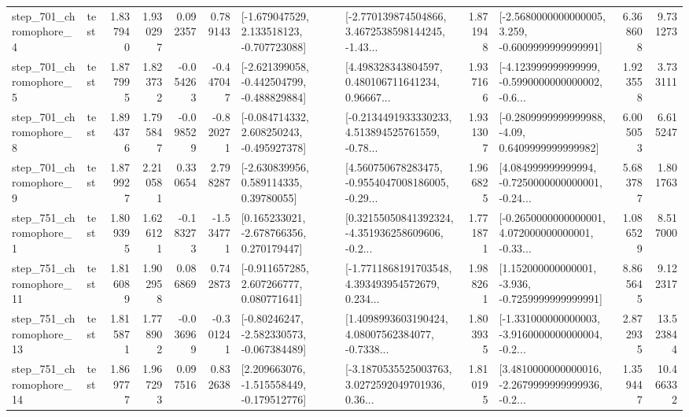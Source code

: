 \begin{tabular}{llrrrrllrlrr}
   step\_701\_chromophore\_4 &      test &      1.837940 &    1.930297 &      0.092357 &  0.789143 &   [-1.679047529, 2.133518123, -0.707723088] &  [-2.770139874504866, 3.4672538598144245, -1.43... &       1.871948 &  [-2.5680000000000005, 3.259, -0.6009999999999991] &            6.368608 &          9.731273 \\
   step\_701\_chromophore\_5 &      test &      1.877995 &    1.823732 &     -0.054263 & -0.447047 &  [-2.621399058, -0.442504799, -0.488829884] &  [4.498328343804597, 0.480106711641234, 0.96667... &       1.937166 &  [-4.123999999999999, -0.5990000000000002, -0.6... &            1.923558 &          3.733111 \\
   step\_701\_chromophore\_8 &      test &      1.894376 &    1.795847 &     -0.098529 & -0.820271 &   [-0.084714332, 2.608250243, -0.495927378] &  [-0.2134491933330233, 4.513894525761559, -0.78... &       1.931307 &   [-0.2809999999999988, -4.09, 0.6409999999999982] &            6.005053 &          6.615247 \\
   step\_701\_chromophore\_9 &      test &      1.879927 &    2.210581 &      0.330654 &  2.798287 &     [-2.630839956, 0.589114335, 0.39780055] &  [4.560750678283475, -0.9554047008186005, -0.29... &       1.966825 &  [4.084999999999994, -0.7250000000000001, -0.24... &            5.683787 &          1.801763 \\
   step\_751\_chromophore\_1 &      test &      1.809395 &    1.626121 &     -0.183273 & -1.534771 &    [0.165233021, -2.678766356, 0.270179447] &  [0.32155050841392324, -4.351936258609606, -0.2... &       1.771871 &  [-0.2650000000000001, 4.072000000000001, -0.33... &            1.086529 &          8.517000 \\
  step\_751\_chromophore\_11 &      test &      1.816089 &    1.902958 &      0.086869 &  0.742873 &    [-0.911657285, 2.607266777, 0.080771641] &  [-1.7711868191703548, 4.393493954572679, 0.234... &       1.988261 &   [1.152000000000001, -3.936, -0.7259999999999991] &            8.865645 &          9.122317 \\
  step\_751\_chromophore\_13 &      test &      1.815871 &    1.778902 &     -0.036969 & -0.301241 &   [-0.80246247, -2.582330573, -0.067384489] &  [1.4098993603190424, 4.08007562384077, -0.7338... &       1.803935 &  [-1.331000000000003, -3.9160000000000004, -0.2... &            2.872935 &         13.523844 \\
  step\_751\_chromophore\_14 &      test &      1.869777 &    1.967293 &      0.097516 &  0.832638 &   [2.209663076, -1.515558449, -0.179512776] &  [-3.1870535525003763, 3.0272592049701936, 0.36... &       1.810195 &  [3.4810000000000016, -2.2679999999999936, -0.2... &            1.359447 &         10.466332 \\

\end{tabular}
